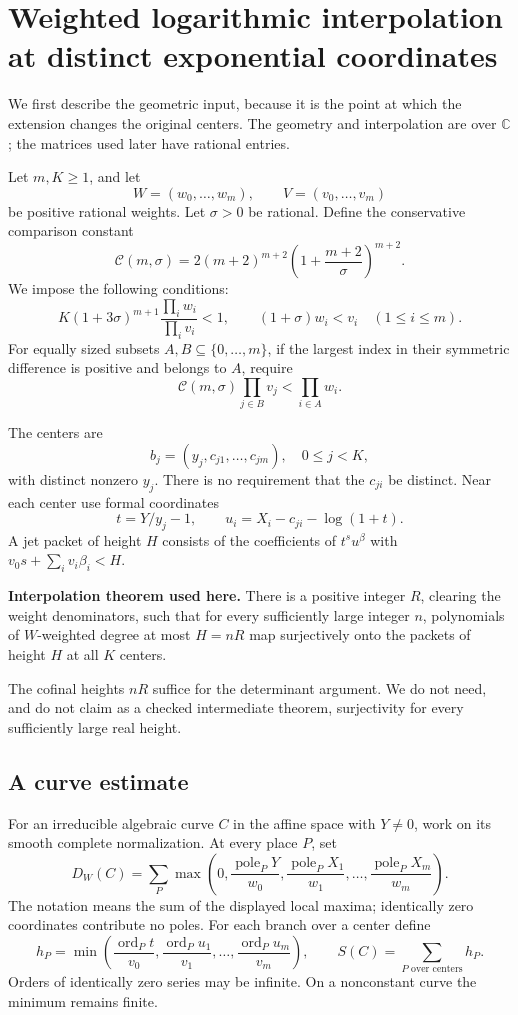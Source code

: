 \section{Weighted logarithmic interpolation at distinct exponential coordinates}

We first describe the geometric input, because it is the point at which the extension changes the original centers. The geometry and interpolation are over \(\mathbb C\); the matrices used later have rational entries.

Let \(m,K\ge1\), and let
\[
W=(w_0,\ldots,w_m),\qquad V=(v_0,\ldots,v_m)
\]
be positive rational weights. Let \(\sigma>0\) be rational. Define the conservative comparison constant
\[
\mathcal C(m,\sigma)=
2(m+2)^{m+2}\left(1+\frac{m+2}{\sigma}\right)^{m+2}.
\]
We impose the following conditions:
\[
K(1+3\sigma)^{m+1}\frac{\prod_iw_i}{\prod_iv_i}<1,
\qquad
(1+\sigma)w_i<v_i\quad(1\le i\le m).
\tag{2}
\]
For equally sized subsets \(A,B\subseteq\{0,\ldots,m\}\), if the largest index in their symmetric difference is positive and belongs to \(A\), require
\[
\mathcal C(m,\sigma)\prod_{j\in B}v_j
<\prod_{i\in A}w_i.
\tag{3}
\]

The centers are
\[
b_j=(y_j,c_{j1},\ldots,c_{jm}),\quad 0\le j<K,
\]
with distinct nonzero \(y_j\). There is no requirement that the \(c_{ji}\) be distinct. Near each center use formal coordinates
\[
t=Y/y_j-1,\qquad
u_i=X_i-c_{ji}-\log(1+t).
\tag{4}
\]
A jet packet of height \(H\) consists of the coefficients of \(t^su^\beta\) with \(v_0s+\sum_i v_i\beta_i<H\).

\textbf{Interpolation theorem used here.} There is a positive integer \(R\), clearing the weight denominators, such that for every sufficiently large integer \(n\), polynomials of \(W\)-weighted degree at most \(H=nR\) map surjectively onto the packets of height \(H\) at all \(K\) centers.

The cofinal heights \(nR\) suffice for the determinant argument. We do not need, and do not claim as a checked intermediate theorem, surjectivity for every sufficiently large real height.

\subsection{A curve estimate}

For an irreducible algebraic curve \(C\) in the affine space with \(Y\ne0\), work on its smooth complete normalization. At every place \(P\), set
\[
D_W(C)=\sum_P
\max\left(0,\frac{\operatorname{pole}_P Y}{w_0},
\frac{\operatorname{pole}_P X_1}{w_1},\ldots,
\frac{\operatorname{pole}_P X_m}{w_m}\right).
\]
The notation means the sum of the displayed local maxima; identically zero coordinates contribute no poles. For each branch over a center define
\[
h_P=\min\left(\frac{\operatorname{ord}_P t}{v_0},
\frac{\operatorname{ord}_P u_1}{v_1},\ldots,
\frac{\operatorname{ord}_P u_m}{v_m}\right),\qquad
S(C)=\sum_{P\text{ over centers}}h_P.
\]
Orders of identically zero series may be infinite. On a nonconstant curve the minimum remains finite.

